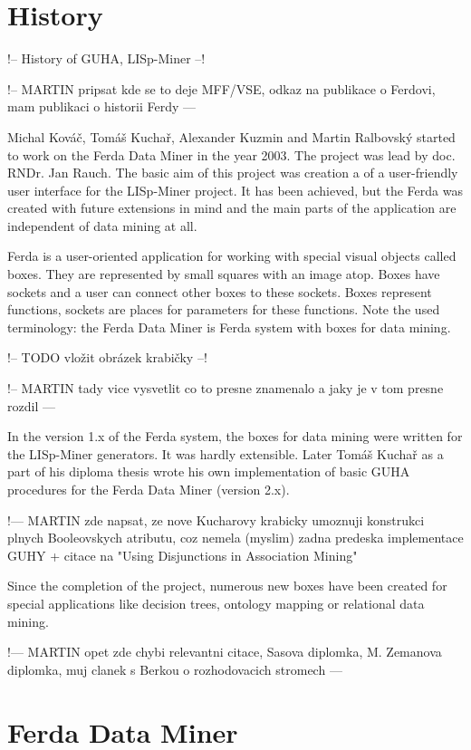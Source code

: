 \documentclass[a4paper,12pt]{book}
\begin{document}
\section{History}
!-- History of GUHA, LISp-Miner --!

!-- MARTIN pripsat kde se to deje MFF/VSE, odkaz na publikace o Ferdovi, mam publikaci o historii Ferdy ---

Michal Kováč, Tomáš Kuchař, Alexander Kuzmin and Martin Ralbovský started to work on the Ferda Data Miner in the year 2003. The project was lead by doc. RNDr. Jan Rauch. The basic aim of this project was creation a of a user-friendly user interface for the LISp-Miner project. It has been achieved, but the Ferda was created with future extensions in mind and the main parts of the application are independent of data mining at all.

Ferda is a user-oriented application for working with special visual objects called boxes. They are represented by small squares with an image atop. Boxes have sockets and a user can connect other boxes to these sockets. Boxes represent functions, sockets are places for parameters for these functions. Note the used terminology: the Ferda Data Miner is Ferda system with boxes for data mining.

!-- TODO vložit obrázek krabičky --!

!-- MARTIN tady vice vysvetlit co to presne znamenalo a jaky je v tom presne rozdil --- 

In the version 1.x of the Ferda system, the boxes for data mining were written for the LISp-Miner generators. It was hardly extensible. Later Tomáš Kuchař as a part of his diploma thesis \cite{thesisKuchar} wrote his own implementation of basic GUHA procedures for the Ferda Data Miner (version 2.x).

!--- MARTIN zde napsat, ze nove Kucharovy krabicky umoznuji konstrukci plnych Booleovskych atributu, coz nemela (myslim) zadna predeska implementace GUHY + citace na "Using Disjunctions in Association Mining"

Since the completion of the project, numerous new boxes have been created for special applications like decision trees, ontology mapping or relational data mining.

!--- MARTIN opet zde chybi relevantni citace, Sasova diplomka, M. Zemanova diplomka, muj clanek s Berkou o rozhodovacich stromech ---


\section{Ferda Data Miner}
\end{document}
